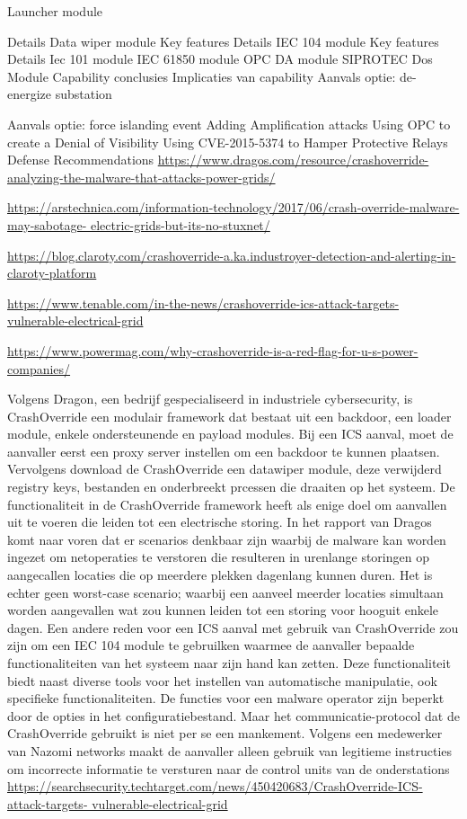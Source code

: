 		Launcher module
		
		Details
		Data wiper module
		Key features
		Details
		IEC 104 module
		Key features
		Details
		Iec 101 module
		IEC 61850 module
		OPC DA module
		SIPROTEC Dos Module
		Capability conclusies
		Implicaties van capability
		Aanvals optie: de-energize substation
		
		Aanvals optie: force islanding event
		Adding Amplification attacks
		Using OPC to create a Denial of Visibility
		Using CVE-2015-5374 to Hamper Protective Relays
		Defense Recommendations
		\url{	https://www.dragos.com/resource/crashoverride-analyzing-the-malware-that-attacks-power-grids/}
	
		
		\url{https://arstechnica.com/information-technology/2017/06/crash-override-malware-may-sabotage-
			electric-grids-but-its-no-stuxnet/}
		
		\url{https://blog.claroty.com/crashoverride-a.ka.industroyer-detection-and-alerting-in-claroty-platform}
		
		\url{https://www.tenable.com/in-the-news/crashoverride-ics-attack-targets-vulnerable-electrical-grid}
		
		\url{https://www.powermag.com/why-crashoverride-is-a-red-flag-for-u-s-power-companies/}
		
		Volgens Dragon, een bedrijf gespecialiseerd in industriele cybersecurity, is CrashOverride een
		modulair framework dat bestaat uit een backdoor, een loader module, enkele ondersteunende en
		payload modules. Bij een ICS aanval, moet de aanvaller eerst een proxy server instellen om een
		backdoor te kunnen plaatsen. Vervolgens download de CrashOverride een datawiper module, deze
		verwijderd registry keys, bestanden en onderbreekt prcessen die draaiten op het systeem.
		De functionaliteit in de CrashOverride framework heeft als enige doel om aanvallen uit te voeren die
		leiden tot een electrische storing. In het rapport van Dragos komt naar voren dat er scenarios
		denkbaar zijn waarbij de malware kan worden ingezet om netoperaties te verstoren die resulteren in
		urenlange storingen op aangecallen locaties die op meerdere plekken dagenlang kunnen duren. Het
		is echter geen worst-case scenario; waarbij een aanveel meerder locaties simultaan worden
		aangevallen wat zou kunnen leiden tot een storing voor hooguit enkele dagen.
		Een andere reden voor een ICS aanval met gebruik van CrashOverride zou zijn om een IEC 104
		module te gebruilken waarmee de aanvaller bepaalde functionaliteiten van het systeem naar zijn
		hand kan zetten.
		Deze functionaliteit biedt naast diverse tools voor het instellen van automatische manipulatie, ook
		specifieke functionaliteiten. De functies voor een malware operator zijn beperkt door de opties in het
		configuratiebestand.
		Maar het communicatie-protocol dat de CrashOverride gebruikt is niet per se een mankement.
		Volgens een medewerker van Nazomi networks maakt de aanvaller alleen gebruik van legitieme
		instructies om incorrecte informatie te versturen naar de control units van de onderstations
		\url{https://searchsecurity.techtarget.com/news/450420683/CrashOverride-ICS-attack-targets-
			vulnerable-electrical-grid}
		
